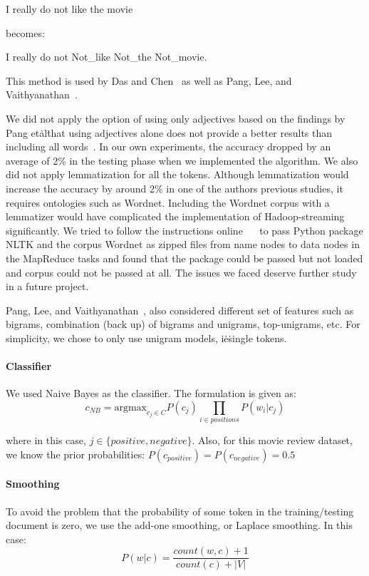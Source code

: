 I really do not like the movie

becomes:

I really do not Not\_like Not\_the Not\_movie.

This method is used by Das and
Chen~\cite{hid-sp18-405-sentiment-das2001yahoo} as well as Pang, Lee,
and Vaithyanathan~\cite{hid-sp18-405-sentiment-pang2002thumbs}.

We did not apply the option of using only adjectives based on the findings
by Pang et\. al\. that using adjectives alone does not provide a better
results than including all
words~\cite{hid-sp18-405-sentiment-pang2004asentimental}. In our own
experiments, the accuracy dropped by an average of 2\% in the testing
phase when we implemented the algorithm. We also did not apply
lemmatization for all the tokens. Although lemmatization would
increase the accuracy by around 2\% in one of the authors previous
studies, it requires ontologies such as Wordnet. Including the Wordnet
corpus with a lemmatizer would have complicated the implementation of
Hadoop-streaming significantly. We tried to follow the instructions
online~\cite{hid-sp18-405-hadoopstreaming-nltk}
~\cite{hid-sp18-405-hadoopstreaming-corpus}
to pass Python package NLTK and the corpus Wordnet as zipped files
from name nodes to data nodes in the MapReduce tasks and found that
the package could be passed but not loaded and corpus could not be
passed at all. The issues we faced deserve further study in a future
project.

Pang, Lee, and
Vaithyanathan~\cite{hid-sp18-405-sentiment-pang2002thumbs}, also
considered different set of features such as bigrams, combination
(back up) of bigrams and unigrams, top-unigrams, etc. For simplicity,
we chose to only use unigram models, i\.e\. single tokens.

\paragraph{Classifier}
We used Naive Bayes as the classifier. The formulation is given as:
\begin{equation}\label{eq:nb}
c_{NB}=\text{argmax}_{c_j \in C} P(c_j) \prod_{i \in positions} P(w_i|c_j)
\end{equation}

where in this case, $j \in \{positive, negative\}$. Also, for this
movie review dataset, we know the prior probabilities:
$P(c_{positive})=P(c_{negative})=0.5$

\paragraph{Smoothing}
To avoid the problem that the probability of some token in the 
training/testing document is zero, we use the add-one smoothing, or Laplace 
smoothing. In this case:
\begin{equation}\label{eq:sm}
P(w|c) = \frac{count(w,c) + 1}{count(c) + |V|}
\end{equation}

